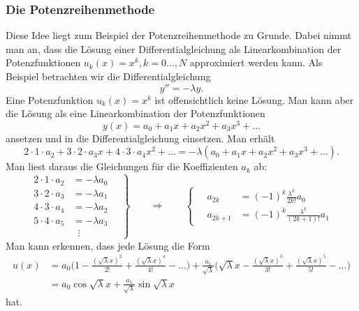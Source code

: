 \subsubsection{Die Potenzreihenmethode}
Diese Idee liegt zum Beispiel der Potenzreihenmethode zu Grunde.
Dabei nimmt man an, dass die Lösung einer Differentialgleichung als
Linearkombination der Potenzfunktionen $u_k(x)=x^k, k=0\dots,N$
approximiert werden kann.
Als Beispiel betrachten wir die Differentialgleichung
\[
y''=-\lambda y.
\]
Eine Potenzfunktion $u_k(x)=x^k$ ist offensichtlich keine Lösung.
Man kann aber die Lösung als eine Linearkombination
der Potenzfunktionen
\[
y(x)
=
a_0+a_1x+a_2x^2+a_3x^3+\dots
\]
ansetzen und in die Differentialgleichung einsetzen.
Man erhält
\[
2\cdot 1 \cdot a_2
+
3\cdot 2 \cdot a_3x
+
4\cdot 3 \cdot a_4x^2
+
\dots
=
-\lambda(
a_0+a_1x+a_2x^2+a_3x^3+\dots).
\]
Man liest daraus die Gleichungen für die Koeffizienten $a_k$ ab:
\begin{equation*}
\left.
\begin{aligned}
2\cdot 1\cdot a_2&=-\lambda a_0\\
3\cdot 2\cdot a_3&=-\lambda a_1\\
4\cdot 3\cdot a_4&=-\lambda a_2\\
5\cdot 4\cdot a_5&=-\lambda a_3\\
&\;\;\vdots
\end{aligned}
\quad
\right\}
\qquad\Rightarrow\qquad
\left\{
\quad
\begin{aligned}
a_{2k}  &=(-1)^k\frac{\lambda^k}{ 2k!   }a_0\\
a_{2k+1}&=(-1)^k\frac{\lambda^k}{(2k+1)!}a_1
\end{aligned}
\right.
\end{equation*}
Man kann erkennen, dass jede Lösung die Form
\begin{align*}
u(x)
&=
a_0
\biggl(
1-\frac{(\sqrt{\lambda}x)^2}{2!} + \frac{(\sqrt{\lambda}x)^4}{4!}-\dots
\biggr)
+
\frac{a_1}{\sqrt{\lambda}}
\biggl(
\sqrt{\lambda}x
-
\frac{(\sqrt{\lambda}x)^3}{3!} + \frac{(\sqrt{\lambda}x)^5}{5!}-\dots
\biggr)
\\
&= a_0 \cos \sqrt{\lambda}x
+ \frac{a_1}{\sqrt{\lambda}} \sin\sqrt{\lambda}x
\end{align*}
hat.

